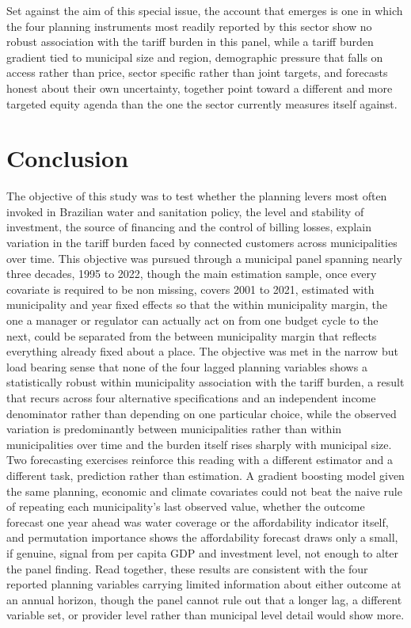 \documentclass[pdflatex,sn-mathphys-num]{sn-jnl}%
\theoremstyle{thmstyleone}%
\theoremstyle{thmstyletwo}%
\theoremstyle{thmstylethree}%
\begin{document}
Set against the aim of this special issue, the account that emerges is one in which the four planning instruments most readily reported by this sector show no robust association with the tariff burden in this panel, while a tariff burden gradient tied to municipal size and region, demographic pressure that falls on access rather than price, sector specific rather than joint targets, and forecasts honest about their own uncertainty, together point toward a different and more targeted equity agenda than the one the sector currently measures itself against.

\section{Conclusion}\label{sec13}

The objective of this study was to test whether the planning levers most often invoked in Brazilian water and sanitation policy, the level and stability of investment, the source of financing and the control of billing losses, explain variation in the tariff burden faced by connected customers across municipalities over time. This objective was pursued through a municipal panel spanning nearly three decades, 1995 to 2022, though the main estimation sample, once every covariate is required to be non missing, covers 2001 to 2021, estimated with municipality and year fixed effects so that the within municipality margin, the one a manager or regulator can actually act on from one budget cycle to the next, could be separated from the between municipality margin that reflects everything already fixed about a place. The objective was met in the narrow but load bearing sense that none of the four lagged planning variables shows a statistically robust within municipality association with the tariff burden, a result that recurs across four alternative specifications and an independent income denominator rather than depending on one particular choice, while the observed variation is predominantly between municipalities rather than within municipalities over time and the burden itself rises sharply with municipal size. Two forecasting exercises reinforce this reading with a different estimator and a different task, prediction rather than estimation. A gradient boosting model given the same planning, economic and climate covariates could not beat the naive rule of repeating each municipality's last observed value, whether the outcome forecast one year ahead was water coverage or the affordability indicator itself, and permutation importance shows the affordability forecast draws only a small, if genuine, signal from per capita GDP and investment level, not enough to alter the panel finding. Read together, these results are consistent with the four reported planning variables carrying limited information about either outcome at an annual horizon, though the panel cannot rule out that a longer lag, a different variable set, or provider level rather than municipal level detail would show more.
\end{document}
